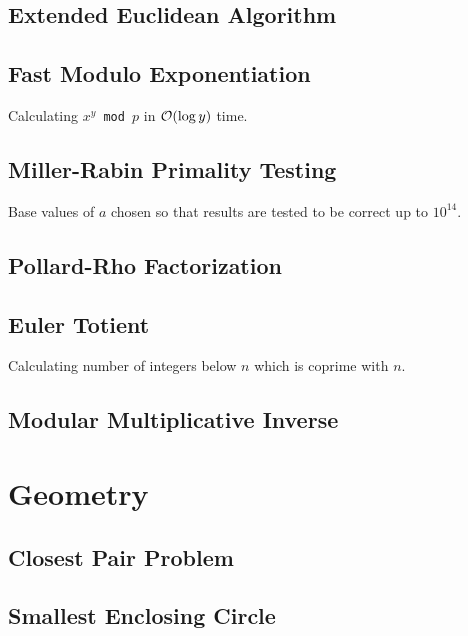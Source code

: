 \documentclass[landscape,8pt]{article}
\begin{document}
\begin{multicols}{2}
  \subsection{Extended Euclidean Algorithm}
    
  \subsection{Fast Modulo Exponentiation}
  Calculating \texttt{$x^y$ mod $p$} in $\order{\log y}$ time.
    

  \subsection{Miller-Rabin Primality Testing}
  Base values of $a$ chosen so that results are tested to be correct up to $10^14$.
    

  \subsection{Pollard-Rho Factorization}
    

  \subsection{Euler Totient}
  Calculating number of integers below $n$ which is coprime with $n$.
    

  \subsection{Modular Multiplicative Inverse}
    

\columnbreak
\section{Geometry}
  \subsection{Closest Pair Problem}

  \subsection{Smallest Enclosing Circle}


\end{multicols}
\end{document}
